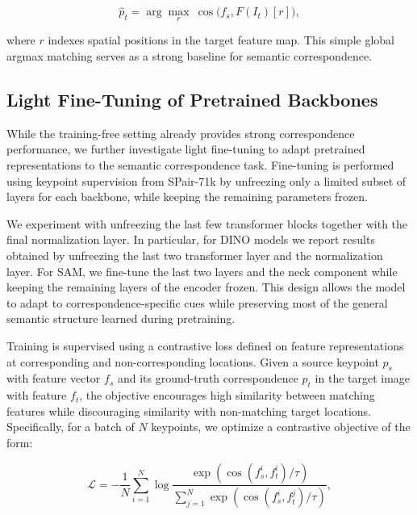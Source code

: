 \begin{equation}
    \hat{p}_t = \arg\max_{r} \ \cos\big(f_s, F(I_t)[r]\big),
\label{eq:argmax}
\end{equation}

where $r$ indexes spatial positions in the target feature map. This simple global argmax matching serves as a strong baseline for semantic correspondence.


\subsection{Light Fine-Tuning of Pretrained Backbones}

While the training-free setting already provides strong correspondence performance, we further investigate light fine-tuning to adapt pretrained representations
to the semantic correspondence task. Fine-tuning is performed using keypoint supervision from SPair-71k by unfreezing only a limited subset of layers
for each backbone, while keeping the remaining parameters frozen.

We experiment with unfreezing the last few transformer blocks together with the final normalization layer. In particular, for DINO models we report results
obtained by unfreezing the last two transformer layer and the normalization layer. For SAM, we fine-tune the last two layers and the neck component
while keeping the remaining layers of the encoder frozen.
This design allows the model to adapt to correspondence-specific cues while preserving most of the general semantic structure learned during pretraining.

Training is supervised using a contrastive loss defined on feature representations at corresponding and non-corresponding locations. Given a source
keypoint $p_s$ with feature vector $f_s$ and its ground-truth correspondence $p_t$ in the target image with feature $f_t$, the objective encourages
high similarity between matching features while discouraging similarity with non-matching target locations. Specifically, for a batch of $N$ keypoints,
we optimize a contrastive objective of the form:

\begin{equation}
    \mathcal{L} = -\frac{1}{N} \sum_{i=1}^{N}
    \log \frac{\exp(\cos(f_s^i, f_t^i) / \tau)}
    {\sum_{j=1}^{N} \exp(\cos(f_s^i, f_t^j) / \tau)},
\label{eq:contrastive_loss}
\end{equation}

